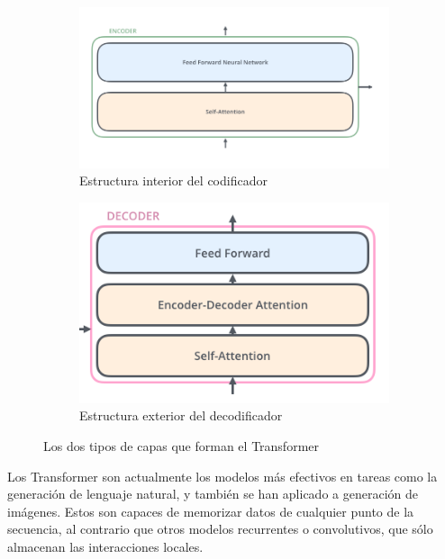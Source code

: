 \begin{figure}[H]
\centering
    \begin{subfigure}{.85\textwidth}
        \centering
        \includegraphics[width=1\linewidth]{imagenes/transformer_encoder.png}
        \caption{Estructura interior del codificador}
        \label{fig:sub1}
    \end{subfigure}%

    \bigskip

    \begin{subfigure}{.5\textwidth}
        \centering
        \includegraphics[width=1\linewidth]{imagenes/transformer_decoder.png}
        \caption{Estructura exterior del decodificador}
    \end{subfigure}

    \caption{Los dos tipos de capas que forman el Transformer \cite{transformers}}
\end{figure}


Los Transformer son actualmente los modelos más efectivos en tareas como la generación de lenguaje natural, y también se han aplicado a generación de imágenes. Estos son capaces de memorizar datos de cualquier punto de la secuencia, al contrario que otros modelos recurrentes o convolutivos, que sólo almacenan las interacciones locales. \cite{transformers}



